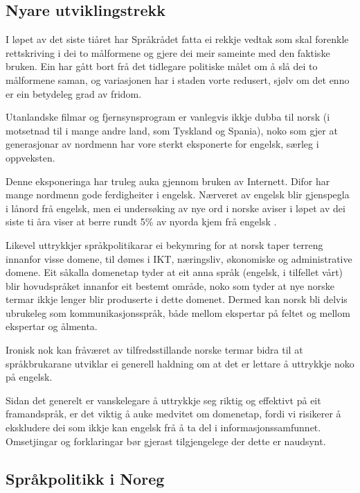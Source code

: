 \begin{multicols}{2}
\subsection{Nyare utviklingstrekk}

I løpet av det siste tiåret har Språkrådet fatta ei rekkje vedtak som skal forenkle rettskriving i dei to målformene og gjere dei meir sameinte med den faktiske bruken. Ein har gått bort frå det tidlegare politiske målet om å slå dei to målformene saman, og variasjonen har i staden vorte redusert, sjølv om det enno er ein betydeleg grad av fridom. 

Utanlandske filmar og fjernsynsprogram er vanlegvis ikkje dubba til norsk (i motsetnad til i mange andre land, som Tyskland og Spania), noko som gjer at generasjonar av nordmenn har vore sterkt eksponerte for engelsk, særleg i oppveksten. 

Denne eksponeringa har truleg auka gjennom bruken av Internett. 
Difor har mange nordmenn gode ferdigheiter i engelsk. 
Nærveret av engelsk blir gjenspegla i lånord frå engelsk, men ei undersøking av nye ord i norske aviser i løpet av dei siste ti åra viser at berre rundt 5\% av nyorda kjem frå engelsk \cite{And:2011}.


Likevel uttrykkjer språkpolitikarar ei bekymring \cite{nih:2005} for at norsk taper terreng innanfor visse domene, til dømes i IKT, næringsliv, økonomiske og administrative domene. 
Eit såkalla domenetap tyder at eit anna språk (engelsk, i tilfellet vårt) blir hovudspråket innanfor eit bestemt område, noko som tyder at nye norske termar ikkje lenger blir produserte i dette domenet. Dermed kan norsk bli delvis ubrukeleg som kommunikasjonsspråk, både mellom ekspertar på feltet og mellom ekspertar og ålmenta. 

Ironisk nok kan fråværet av tilfredsstillande norske termar bidra til at språkbrukarane utviklar ei generell haldning om at det er lettare å uttrykkje noko på engelsk. 

Sidan det generelt er vanskelegare å uttrykkje seg riktig og effektivt på eit framandspråk, er det viktig å auke medvitet om domenetap, fordi vi risikerer å ekskludere dei som ikkje kan engelsk frå å ta del i informasjonssamfunnet. 
Omsetjingar og forklaringar bør gjerast tilgjengelege der dette er naudsynt.

\subsection{Språkpolitikk i Noreg}


\end{multicols}
